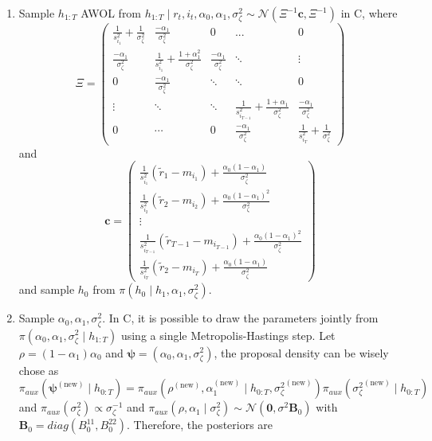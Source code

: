 \documentclass[
  12pt,
]{book}
\theoremstyle{break}
\theoremstyle{nonumberplain}
\begin{document}
\begin{enumerate}
\item Sample $h_{1:T}$ AWOL from $h_{1:T}\mid r_t,i_t,\alpha_0,\alpha_1,\sigma^2_\zeta \sim \mathcal{N}(\Xi^{-1} \boldsymbol{c},\Xi^{-1})$ in C, where 
\[
\Xi = \begin{pmatrix}
  \frac{1}{s^{2}_{i_1}}+\frac{1}{\sigma^2_\zeta} & \frac{-\alpha_1}{\sigma^{2}_{\zeta}} & 0 & ... & 0 \\
  \frac{-\alpha_1}{\sigma^{2}_{\zeta}} & \frac{1}{s^{2}_{i_1}}+\frac{1+\alpha_1^2}{\sigma^2_\zeta} & \frac{-\alpha_1}{\sigma^{2}_{\zeta}} & \ddots & \vdots \\
  0  &  \frac{-\alpha_1}{\sigma^{2}_{\zeta}} & \ddots & \ddots & 0\\
  \vdots & \ddots & \ddots & \frac{1}{s^{2}_{i_{T-1}}}+\frac{1+\alpha_1}{\sigma^2_\zeta} & \frac{-\alpha_1}{\sigma^{2}_{\zeta}}\\
  0 & \cdots & 0 & \frac{-\alpha_1}{\sigma^{2}_{\zeta}} & \frac{1}{s^{2}_{i_{T}}}+\frac{1}{\sigma^2_\zeta}
  \end{pmatrix}
\]
and 
\[
\boldsymbol{c}= \begin{pmatrix} 
\frac{1}{s^{2}_{i_1}}(\tilde{r}_{1}-m_{i_1})+\frac{\alpha_{0}(1-\alpha_1)}{\sigma^{2}_{\zeta}}\\
\frac{1}{s^{2}_{i_2}}(\tilde{r}_{2}-m_{i_2})+\frac{\alpha_{0}(1-\alpha_1)^2}{\sigma^{2}_{\zeta}}\\
\vdots \\
\frac{1}{s^{2}_{i_{T-1}}}(\tilde{r}_{T-1}-m_{i_{T-1}})+\frac{\alpha_{0}(1-\alpha_1)^2}{\sigma^{2}_{\zeta}}\\
\frac{1}{s^{2}_{i_T}}(\tilde{r}_{2}-m_{i_T})+\frac{\alpha_{0}(1-\alpha_1)}{\sigma^{2}_{\zeta}}
\end{pmatrix}
\]
and sample $h_0$ from $\pi(h_{0}\mid h_{1},\alpha_1,\sigma^{2}_{\zeta})$.
\item Sample $\alpha_0,\alpha_1,\sigma^2_\zeta$. In C, it is possible to draw the parameters jointly from $\pi(\alpha_0,\alpha_1,\sigma^2_\zeta\mid h_{1:T})$ using a single Metropolis-Hastings step. Let $\rho=(1-\alpha_1)\alpha_0$ and $\boldsymbol{\psi}=(\alpha_0,\alpha_1,\sigma^2_\zeta)$, the proposal density can be wisely chose as
\[
\pi_{aux}(\boldsymbol{\psi}^{(\text{new})}\mid h_{0:T})=\pi_{aux}(\rho^{(\text{new})},\alpha_1^{(\text{new})}\mid h_{0:T},{\sigma^{2}_{\zeta}}^{(\text{new})})\pi_{aux}({\sigma^{2}_{\zeta}}^{(\text{new})}\mid h_{0:T})
\]
and $\pi_{aux}(\sigma^2_{\zeta})\propto \sigma^{-1}_{\zeta}$ and $\pi_{aux}(\rho,\alpha_1\mid \sigma^{2}_{\zeta})\sim \mathcal{N}(\boldsymbol{0},\sigma^{2}\boldsymbol{B}_{0})$ with $\boldsymbol{B}_{0}=diag(B_{0}^{11},B_{0}^{22})$. Therefore, the posteriors are 

\end{enumerate}
\end{document}
